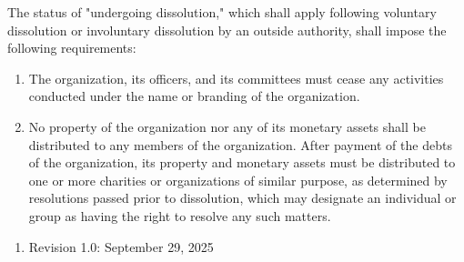 \documentclass[11pt]{article}
\newcounter{h1}
\newcounter{h2}[h1]
\newcounter{h3}[h2]
\begin{document}

The status of "undergoing dissolution," which shall apply following voluntary dissolution or involuntary dissolution by an outside authority, shall impose the following requirements:

\begin{enumerate}
  \item The organization, its officers, and its committees must cease any activities conducted under the name or branding of the organization.  
  \item No property of the organization nor any of its monetary assets shall be distributed to any members of the organization. After payment of the debts of the organization, its property and monetary assets must be distributed to one or more charities or organizations of similar purpose, as determined by resolutions passed prior to dissolution, which may designate an individual or group as having the right to resolve any such matters.
\end{enumerate}


\begin{enumerate}
  \item Revision 1.0: September 29, 2025
\end{enumerate}
\end{document}
